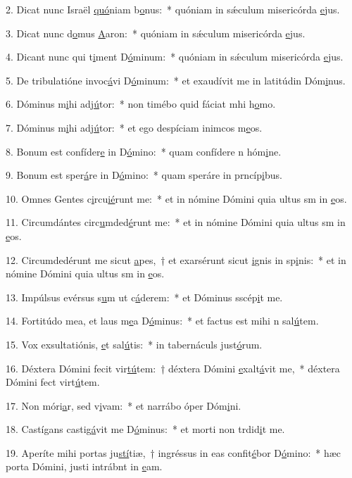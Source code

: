 2. Dicat nunc Israël \uline{quó}niam b\uline{o}nus:~* quóniam in sǽculum misericórda \uline{e}jus.\par 
3. Dicat nunc d\uline{o}mus \uline{A}aron:~* quóniam in sǽculum misericórda \uline{e}jus.\par 
4. Dicant nunc qui t\uline{i}ment D\uline{ó}minum:~* quóniam in sǽculum misericórda \uline{e}jus.\par 
5. De tribulatióne invoc\uline{á}vi D\uline{ó}minum:~* et exaudívit me in latitúdin Dóm\uline{i}nus.\par 
6. Dóminus m\uline{i}hi adj\uline{ú}tor:~* non timébo quid fáciat mhi h\uline{o}mo.\par 
7. Dóminus m\uline{i}hi adj\uline{ú}tor:~* et ego despíciam inimcos m\uline{e}os.\par 
8. Bonum est confíder\uline{e} in D\uline{ó}mino:~* quam confídere n hóm\uline{i}ne.\par 
9. Bonum est sper\uline{á}re in D\uline{ó}mino:~* quam speráre in prncíp\uline{i}bus.\par 
10. Omnes Gentes c\uline{i}rcu\uline{ié}runt me:~* et in nómine Dómini quia ultus sm in \uline{e}os.\par 
11. Circumdántes circ\uline{u}mded\uline{é}runt me:~* et in nómine Dómini quia ultus sm in \uline{e}os.\par 
12. Circumdedérunt me sicut \uline{a}pes,~† et exarsérunt sicut \uline{i}gnis in sp\uline{i}nis:~* et in nómine Dómini quia ultus sm in \uline{e}os.\par 
13. Impúlsus evérsus s\uline{u}m ut c\uline{á}derem:~* et Dóminus sscép\uline{i}t me.\par 
14. Fortitúdo mea, et laus m\uline{e}a D\uline{ó}minus:~* et factus est mihi n sal\uline{ú}tem.\par 
15. Vox exsultatiónis, \uline{e}t sal\uline{ú}tis:~* in tabernáculs just\uline{ó}rum.\par 
16. Déxtera Dómini fecit vir\uline{tú}tem:~† déxtera Dómini \uline{e}xalt\uline{á}vit me,~* déxtera Dómini fect virt\uline{ú}tem.\par 
17. Non móri\uline{a}r, sed v\uline{i}vam:~* et narrábo óper Dóm\uline{i}ni.\par 
18. Castígans castig\uline{á}vit me D\uline{ó}minus:~* et morti non trdid\uline{i}t me.\par 
19. Aperíte mihi portas ju\uline{stí}tiæ,~† ingréssus in eas confit\uline{é}bor D\uline{ó}mino:~* hæc porta Dómini, justi intrábnt in \uline{e}am.\par 
